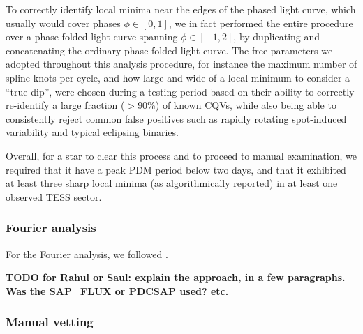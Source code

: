 \documentclass[11pt,twocolumn,tighten]{aastex63}
\begin{document}
To correctly identify local minima near the edges of the phased light
curve, which usually would cover phases $\phi \in [ 0,1 ]$, we in fact
performed the entire procedure over a phase-folded light curve
spanning $\phi \in [-1,2 ]$, by duplicating and concatenating the
ordinary phase-folded light curve.  The free parameters we adopted
throughout this analysis procedure, for instance the maximum number of
spline knots per cycle, and how large and wide of a local minimum to
consider a ``true dip'', were chosen during a testing period based on
their ability to correctly re-identify a large fraction ($>$90\%) of
known CQVs, while also being able to consistently reject common false
positives such as rapidly rotating spot-induced variability and
typical eclipsing binaries.

Overall, for a star to clear this process and to proceed to manual
examination, we required that it have a peak PDM period below two
days, and that it exhibited at least three sharp local minima (as
algorithmically reported) in at least one observed TESS sector.



\subsubsection{Fourier analysis}
\label{subsec:fourier}
For the Fourier analysis, we followed \citet{2019ApJ...876..127Z}.

{\bf TODO for Rahul or Saul: explain the approach, in a few
	paragraphs.  Was the SAP\_FLUX or PDCSAP used? etc. }

\subsubsection{Manual vetting}
\end{document}
